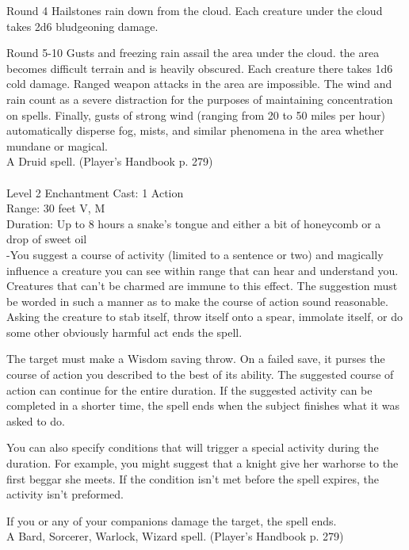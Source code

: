 \documentclass[10pt,twocolumn]{report}
\begin{document}
Round 4
Hailstones rain down from the cloud. Each creature under the cloud takes 2d6 bludgeoning damage.

Round 5-10
Gusts and freezing rain assail the area under the cloud. the area becomes difficult terrain and is heavily obscured. Each creature there takes 1d6 cold damage. Ranged weapon attacks in the area are impossible. The wind and rain count as a severe distraction for the purposes of maintaining concentration on spells. Finally, gusts of strong wind (ranging from 20 to 50 miles per hour) automatically disperse fog, mists, and similar phenomena in the area whether mundane or magical.\\
A Druid spell. (Player's Handbook p. 279) \\


 \\
Level 2 \quad Enchantment \quad Cast: 1 Action\\
Range: 30 feet \quad V, M\\
Duration: Up to 8 hours \quad a snake’s tongue and either a bit of honeycomb or a drop of sweet oil\\
-You suggest a course of activity (limited to a sentence or two) and magically influence a creature you can see within range that can hear and understand you. Creatures that can’t be charmed are immune to this effect. The suggestion must be worded in such a manner as to make the course of action sound reasonable. Asking the creature to stab itself, throw itself onto a spear, immolate itself, or do some other obviously harmful act ends the spell.

The target must make a Wisdom saving throw. On a failed save, it purses the course of action you described to the best of its ability. The suggested course of action can continue for the entire duration. If the suggested activity can be completed in a shorter time, the spell ends when the subject finishes what it was asked to do.

You can also specify conditions that will trigger a special activity during the duration. For example, you might suggest that a knight give her warhorse to the first beggar she meets. If the condition isn’t met before the spell expires, the activity isn’t preformed.

If you or any of your companions damage the target, the spell ends.\\
A Bard, Sorcerer, Warlock, Wizard spell. (Player's Handbook p. 279) \\
\end{document}
